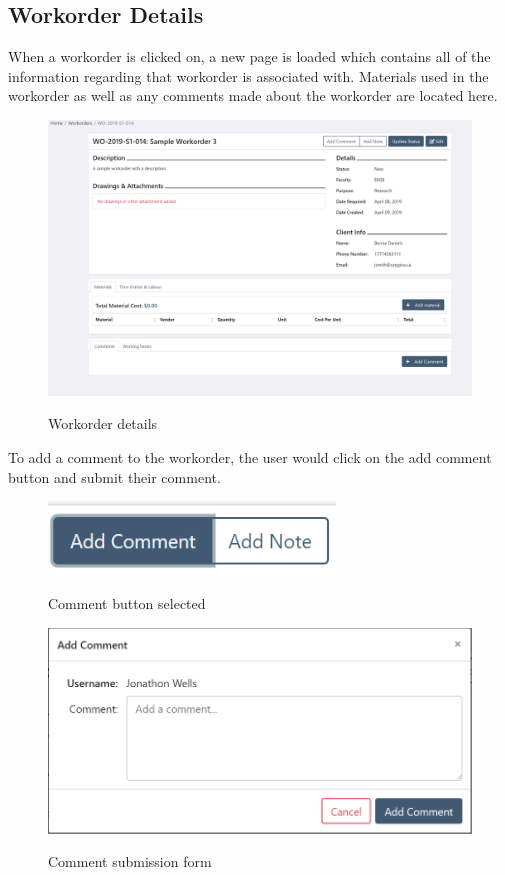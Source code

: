 {{\newpage
\subsection{Workorder Details}
When a workorder is clicked on, a new page is loaded which contains all of the information regarding that workorder is associated with. Materials used in the workorder as well as any comments made about the workorder are located here. 
\begin{figure}[H]
	\centering
	\includegraphics[width=5in]{details.png}\\
	\caption{Workorder details}
	\label{fig:tobias}
\end{figure}

To add a comment to the workorder, the user would click on the add comment button and submit their comment. 
\begin{figure}[H]
	\centering
	\includegraphics[width=3in]{comment-button.png}\\
	\caption{Comment button selected}
	\label{fig:tobias}
\end{figure}

\begin{figure}[H]
	\centering
	\includegraphics[width=5in]{add-comment.png}\\
	\caption{Comment submission form}
	\label{fig:tobias}
\end{figure}

}}
